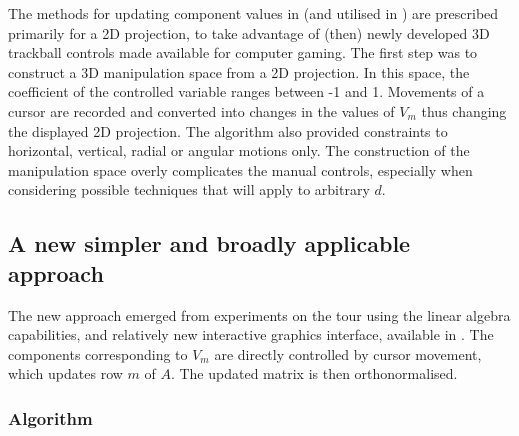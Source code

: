\documentclass[]{interact}
\theoremstyle{plain}%
\theoremstyle{definition}
\theoremstyle{remark}
\begin{document}
The methods for updating component values in \citet{cook_manual_1997}
(and utilised in \citet{spyrison_spinifex_2020}) are prescribed
primarily for a 2D projection, to take advantage of (then) newly
developed 3D trackball controls made available for computer gaming. The
first step was to construct a 3D manipulation space from a 2D
projection. In this space, the coefficient of the controlled variable
ranges between -1 and 1. Movements of a cursor are recorded and
converted into changes in the values of \(V_m\) thus changing the
displayed 2D projection. The algorithm also provided constraints to
horizontal, vertical, radial or angular motions only. The construction
of the manipulation space overly complicates the manual controls,
especially when considering possible techniques that will apply to
arbitrary \(d\).

\hypertarget{a-new-simpler-and-broadly-applicable-approach}{%
\subsection{A new simpler and broadly applicable
approach}\label{a-new-simpler-and-broadly-applicable-approach}}

The new approach emerged from experiments on the tour using the linear
algebra capabilities, and relatively new interactive graphics interface,
available in \citet{Mathematica}. The components corresponding to
\(V_m\) are directly controlled by cursor movement, which updates row
\(m\) of \(A\). The updated matrix is then orthonormalised.

\hypertarget{algorithm}{%
\subsubsection{Algorithm}\label{algorithm}}
\end{document}
